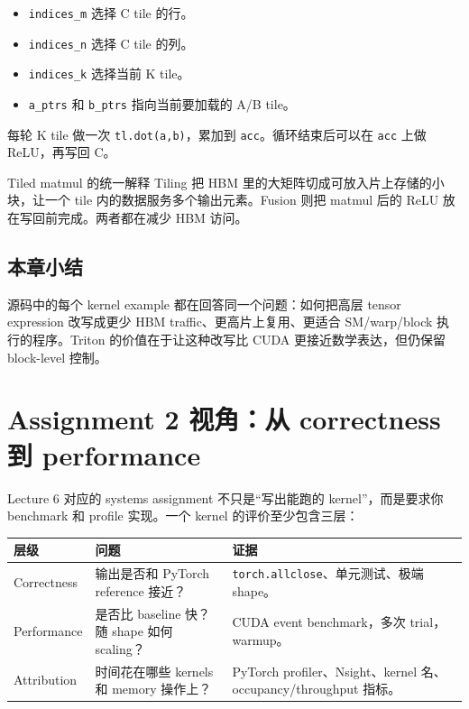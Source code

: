 \documentclass[a4paper]{article}
\begin{document}
\begin{itemize}
    \item \texttt{indices\_m} 选择 C tile 的行。
    \item \texttt{indices\_n} 选择 C tile 的列。
    \item \texttt{indices\_k} 选择当前 K tile。
    \item \texttt{a\_ptrs} 和 \texttt{b\_ptrs} 指向当前要加载的 A/B tile。
\end{itemize}

每轮 K tile 做一次 \texttt{tl.dot(a,b)}，累加到 \texttt{acc}。循环结束后可以在 \texttt{acc} 上做 ReLU，再写回 C。

\begin{importantbox}{Tiled matmul 的统一解释}
Tiling 把 HBM 里的大矩阵切成可放入片上存储的小块，让一个 tile 内的数据服务多个输出元素。Fusion 则把 matmul 后的 ReLU 放在写回前完成。两者都在减少 HBM 访问。
\end{importantbox}

\subsection{本章小结}

源码中的每个 kernel example 都在回答同一个问题：如何把高层 tensor expression 改写成更少 HBM traffic、更高片上复用、更适合 SM/warp/block 执行的程序。Triton 的价值在于让这种改写比 CUDA 更接近数学表达，但仍保留 block-level 控制。



\section{Assignment 2 视角：从 correctness 到 performance}

Lecture 6 对应的 systems assignment 不只是“写出能跑的 kernel”，而是要求你 benchmark 和 profile 实现。一个 kernel 的评价至少包含三层：

\begin{longtable}{p{}p{}p{}}
\toprule
\textbf{层级} & \textbf{问题} & \textbf{证据} \\
\midrule
Correctness & 输出是否和 PyTorch reference 接近？ & \texttt{torch.allclose}、单元测试、极端 shape。 \\
Performance & 是否比 baseline 快？随 shape 如何 scaling？ & CUDA event benchmark，多次 trial，warmup。 \\
Attribution & 时间花在哪些 kernels 和 memory 操作上？ & PyTorch profiler、Nsight、kernel 名、occupancy/throughput 指标。 \\
\bottomrule
\end{longtable}
\end{document}
